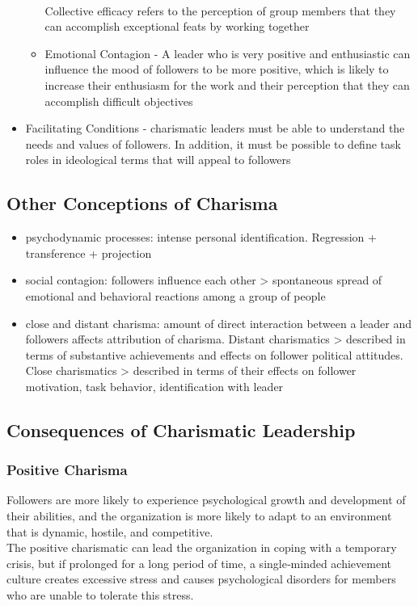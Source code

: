 \begin{itemize}
\begin{itemize}
			\\Collective efficacy refers to the perception of group members that they can accomplish exceptional feats by working together
		\item Emotional Contagion - A leader who is very positive and enthusiastic can influence the mood of followers to be more positive, which is likely to increase their enthusiasm for the work and their perception that they can accomplish difficult objectives
	\end{itemize}
	\item Facilitating Conditions - charismatic leaders must be able to understand the needs and values of followers. In addition, it must be possible to 	define task roles in ideological terms that will appeal to followers
\end{itemize}

\subsection{Other Conceptions of Charisma} %
\label{sub:other_conceptions_of_charisma}
\begin{itemize}
	\item psychodynamic processes: intense personal identification. Regression + transference + projection
	\item social contagion: followers influence each other > spontaneous spread of emotional and behavioral reactions among a group of people
	\item close and distant charisma: amount of direct interaction between a leader and followers affects attribution of charisma. Distant charismatics > described in terms of substantive achievements and effects on follower political attitudes. Close charismatics > described in terms of their effects on follower motivation, task behavior, identification with leader

\end{itemize}


\subsection{Consequences of Charismatic Leadership} %
\label{sub:consequences_of_charismatic_leadership}

\subsubsection{Positive Charisma} %
\label{ssub:positive_charisma}
	Followers are more likely to experience psychological growth and development of their abilities, and the organization is more likely to adapt to an environment that is dynamic, hostile, and competitive.
	\\The positive charismatic can lead the organization in coping with a temporary crisis, but if prolonged for a long period of time, a single‐minded achievement culture creates excessive stress and causes psychological disorders for members who are unable to tolerate this stress.

